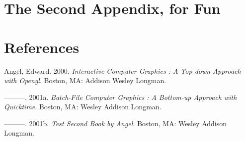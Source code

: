 \documentclass[12pt,twoside]{dukestatscithesis}
\theoremstyle{definition}
\theoremstyle{definition}
\theoremstyle{definition}
\theoremstyle{remark}
\begin{document}
\chapter{The Second Appendix, for
Fun}\label{the-second-appendix-for-fun}

\backmatter

\chapter*{References}\label{references}


\noindent

\setlength{\parindent}{-0.20in} \setlength{\leftskip}{0.20in}
\setlength{\parskip}{8pt}

\hypertarget{refs}{}
\hypertarget{ref-angel2000}{}
Angel, Edward. 2000. \emph{Interactive Computer Graphics : A Top-down
Approach with Opengl}. Boston, MA: Addison Wesley Longman.

\hypertarget{ref-angel2001}{}
---------. 2001a. \emph{Batch-File Computer Graphics : A Bottom-up
Approach with Quicktime}. Boston, MA: Wesley Addison Longman.

\hypertarget{ref-angel2002a}{}
---------. 2001b. \emph{Test Second Book by Angel}. Boston, MA: Wesley
Addison Longman.


\end{document}
